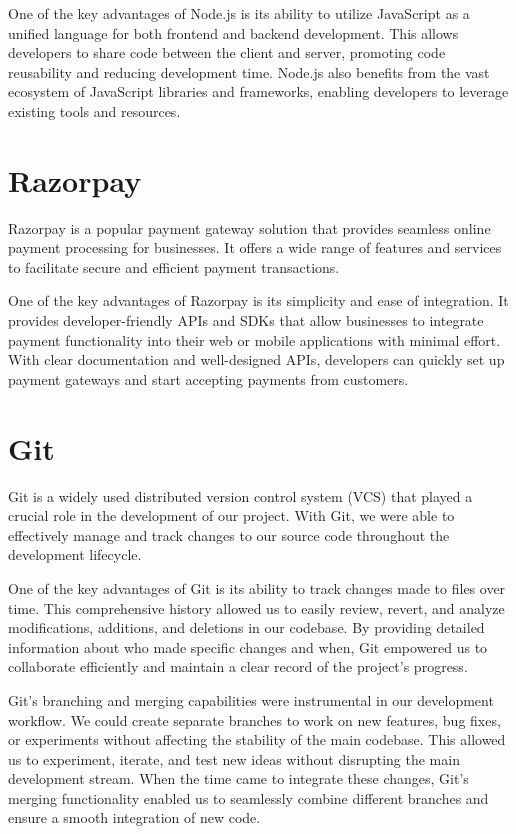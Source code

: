 \documentclass[a4paper,11pt]{report}
\begin{document}
One of the key advantages of Node.js is its ability to utilize JavaScript as a unified language for both frontend and backend development. This allows developers to share code between the client and server, promoting code reusability and reducing development time. Node.js also benefits from the vast ecosystem of JavaScript libraries and frameworks, enabling developers to leverage existing tools and resources.

\section{Razorpay}
Razorpay is a popular payment gateway solution that provides seamless online payment processing for businesses. It offers a wide range of features and services to facilitate secure and efficient payment transactions.

One of the key advantages of Razorpay is its simplicity and ease of integration. It provides developer-friendly APIs and SDKs that allow businesses to integrate payment functionality into their web or mobile applications with minimal effort. With clear documentation and well-designed APIs, developers can quickly set up payment gateways and start accepting payments from customers.

\section{Git}
Git is a widely used distributed version control system (VCS) that played a crucial role in the development of our project. With Git, we were able to effectively manage and track changes to our source code throughout the development lifecycle.

One of the key advantages of Git is its ability to track changes made to files over time. This comprehensive history allowed us to easily review, revert, and analyze modifications, additions, and deletions in our codebase. By providing detailed information about who made specific changes and when, Git empowered us to collaborate efficiently and maintain a clear record of the project's progress.

Git's branching and merging capabilities were instrumental in our development workflow. We could create separate branches to work on new features, bug fixes, or experiments without affecting the stability of the main codebase. This allowed us to experiment, iterate, and test new ideas without disrupting the main development stream. When the time came to integrate these changes, Git's merging functionality enabled us to seamlessly combine different branches and ensure a smooth integration of new code.
\end{document}
